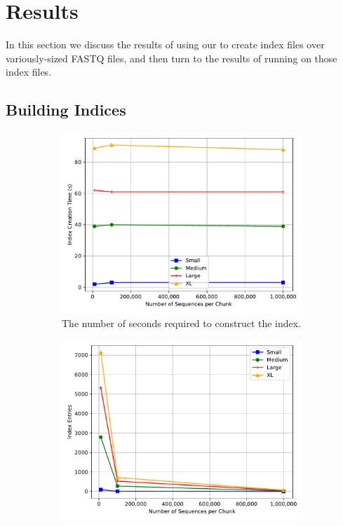 \section{Results}
\label{sec:results}

In this section we discuss the results of using our \ibuilder to create index
files over variously-sized \gzip FASTQ files, and then turn to the results of
running \ireader on those index files.

\subsection{Building Indices}
\label{sec:buildresults}

\begin{figure}%
\centering
    \begin{subfigure}[c]{.48\textwidth}
        \includegraphics[width=\linewidth]{figs/creation-time.pdf}
        \caption{The number of seconds required to construct the index.}
        \label{fig:creation}
    \end{subfigure}%
    \begin{subfigure}[c]{.48\textwidth}
        \includegraphics[width=\linewidth]{figs/index-entries.pdf}

\end{subfigure}
\end{figure}
